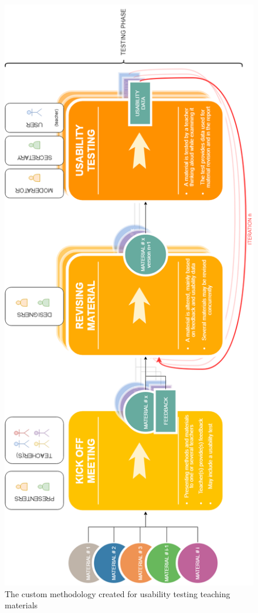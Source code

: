 \begin{figure}
\centering
\includegraphics[scale=0.6,angle=-90]{figure/workflow.png}
\vspace*{2cm}
\caption{The custom methodology created for usability testing teaching materials}
\label{workflow}
\end{figure}

